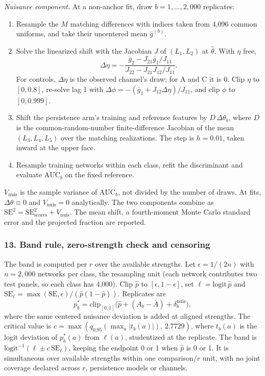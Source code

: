 \emph{Nuisance component.} At a non-anchor fit, draw $b=1,\ldots,2{,}000$ replicates:
\begin{enumerate}
\item Resample the $M$ matching differences with indices taken from 4,096 common uniforms, and take their uncentered mean $\bar g^{(b)}$.
\item Solve the linearized shift with the Jacobian $J$ of $(L_1,L_2)$ at $\hat\theta$. With $\eta$ free,
\begin{equation*}
\Delta\eta=-\frac{\bar g_2-J_{21}\bar g_1/J_{11}}{J_{22}-J_{21}J_{12}/J_{11}}.
\end{equation*}
For controls, $\Delta\eta$ is the observed channel's draw; for A and C it is 0. Clip $\eta$ to $[0,0.8]$, re-solve lag 1 with $\Delta\phi=-(\bar g_1+J_{12}\Delta\eta)/J_{11}$, and clip $\phi$ to $[0,0.999]$.
\item Shift the persistence arm's training and reference features by $D\,\Delta\theta_b$, where $D$ is the common-random-number finite-difference Jacobian of the mean $(L_3,L_4,L_5)$ over the matching realizations. The step is $h=0.01$, taken inward at the upper face.
\item Resample training networks within each class, refit the discriminant and evaluate $\mathrm{AUC}_b$ on the fixed reference.
\end{enumerate}
$V_{\mathrm{nuis}}$ is the sample variance of $\mathrm{AUC}_b$, not divided by the number of draws. At  fits, $\Delta\theta\equiv0$ and $V_{\mathrm{nuis}}=0$ analytically. The two components combine as $\mathrm{SE}^2=\mathrm{SE}_{\mathrm{scores}}^2+V_{\mathrm{nuis}}$. The mean shift, a fourth-moment Monte Carlo standard error and the projected fraction are reported.

\subsubsection*{13. Band rule, zero-strength check and censoring}
The band is computed per $r$ over the available strengths. Let $\epsilon=1/(2n)$ with $n=2{,}000$ networks per class, the resampling unit (each network contributes two test panels, so each class has 4,000). Clip $\hat p$ to $[\epsilon,1-\epsilon]$, set $\ell=\mathrm{logit}\,\hat p$ and $\mathrm{SE}_\ell=\max(\mathrm{SE},\epsilon)/(\hat p(1-\hat p))$. Replicates are
\begin{equation*}
p^*_b=\mathrm{clip}_{[0,1]}\bigl(\hat p+(A_b-\bar A)+\delta^{\mathrm{nuis}}_b\bigr),
\end{equation*}
where the same centered nuisance deviation is added at aligned strengths. The critical value is $c=\max(q_{0.95}(\max_a|t_b(a)|),\,2.7729)$, where $t_b(a)$ is the logit deviation of $p^*_b(a)$ from $\ell(a)$, studentized at the replicate. The band is $\mathrm{logit}^{-1}(\ell\pm c\,\mathrm{SE}_\ell)$, keeping the endpoint 0 or 1 when $\hat p$ is 0 or 1. It is simultaneous over available strengths within one comparison/$r$ unit, with no joint coverage declared across $r$, persistence models or channels.

